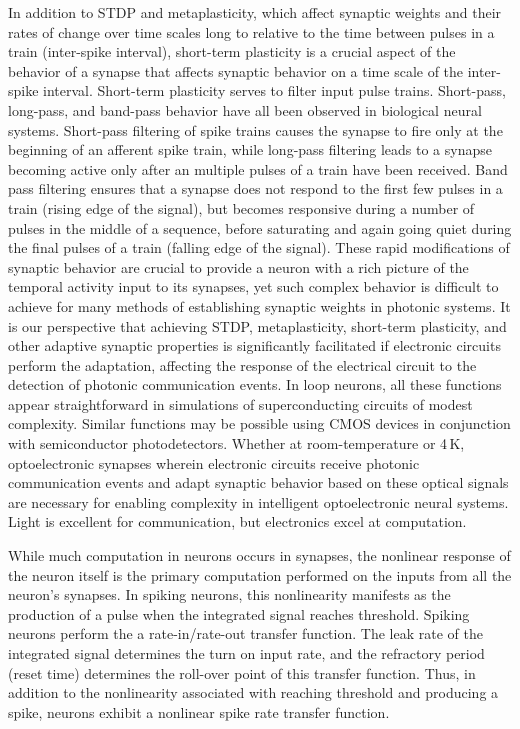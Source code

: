 \documentclass[twocolumn]{article}
\begin{document}
In addition to STDP and metaplasticity, which affect synaptic weights and their rates of change over time scales long to relative to the time between pulses in a train (inter-spike interval), short-term plasticity is a crucial aspect of the behavior of a synapse that affects synaptic behavior on a time scale of the inter-spike interval. Short-term plasticity serves to filter input pulse trains. Short-pass, long-pass, and band-pass behavior have all been observed in biological neural systems. 
Short-pass filtering of spike trains causes the synapse to fire only at the beginning of an afferent spike train, while long-pass filtering leads to a synapse becoming active only after an multiple pulses of a train have been received. Band pass filtering ensures that a synapse does not respond to the first few pulses in a train (rising edge of the signal), but becomes responsive during a number of pulses in the middle of a sequence, before saturating and again going quiet during the final pulses of a train (falling edge of the signal). These rapid modifications of synaptic behavior are crucial to provide a neuron with a rich picture of the temporal activity input to its synapses, yet such complex behavior is difficult to achieve for many methods of establishing synaptic weights in photonic systems. It is our perspective that achieving STDP, metaplasticity, short-term plasticity, and other adaptive synaptic properties is significantly facilitated if electronic circuits perform the adaptation, affecting the response of the electrical circuit to the detection of photonic communication events. In loop neurons, all these functions appear straightforward in simulations of superconducting circuits of modest complexity. Similar functions may be possible using CMOS devices in conjunction with semiconductor photodetectors. Whether at room-temperature or 4\,K, optoelectronic synapses wherein electronic circuits receive photonic communication events and adapt synaptic behavior based on these optical signals are necessary for enabling complexity in intelligent optoelectronic neural systems. Light is excellent for communication, but electronics excel at computation.

While much computation in neurons occurs in synapses, the nonlinear response of the neuron itself is the primary computation performed on the inputs from all the neuron's synapses. In spiking neurons, this nonlinearity manifests as the production of a pulse when the integrated signal reaches threshold. Spiking neurons perform the a rate-in/rate-out transfer function. The leak rate of the integrated signal determines the turn on input rate, and the refractory period (reset time) determines the roll-over point of this transfer function. Thus, in addition to the nonlinearity associated with reaching threshold and producing a spike, neurons exhibit a nonlinear spike rate transfer function. 
\end{document}
